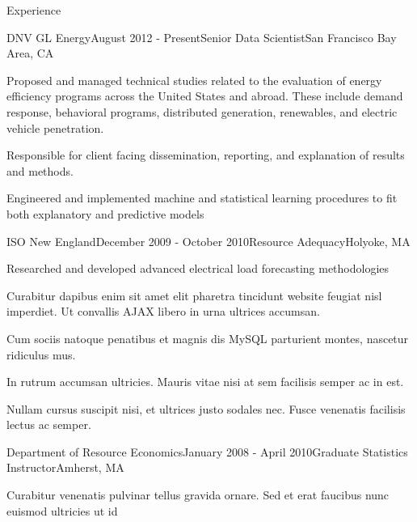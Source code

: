 \documentclass{resume} %
\begin{document}
\begin{rSection}{Experience}

\begin{rSubsection}{DNV GL Energy}{August 2012 - Present}{Senior Data Scientist}{San Francisco Bay Area, CA}
\item Proposed and managed technical studies related to the evaluation of energy efficiency programs across the United States and abroad. These include demand response, behavioral programs, distributed generation, renewables, and electric vehicle  penetration. 
\item Responsible for client facing dissemination, reporting, and explanation of results and methods. 
\item Engineered and implemented machine and statistical learning procedures to fit both explanatory and predictive models
\end{rSubsection}


\begin{rSubsection}{ISO New England}{December 2009 - October 2010}{Resource Adequacy}{Holyoke, MA}
\item Researched and developed advanced electrical load forecasting methodologies
\item Curabitur dapibus enim sit amet elit pharetra tincidunt website feugiat nisl imperdiet. Ut convallis AJAX libero in urna ultrices accumsan.
\item Cum sociis natoque penatibus et magnis dis MySQL parturient montes, nascetur ridiculus mus.
\item In rutrum accumsan ultricies. Mauris vitae nisi at sem facilisis semper ac in est.
\item Nullam cursus suscipit nisi, et ultrices justo sodales nec. Fusce venenatis facilisis lectus ac semper.
\end{rSubsection}


\begin{rSubsection}{Department of Resource Economics}{January 2008 - April 2010}{Graduate Statistics Instructor}{Amherst, MA}
\item 
\item Curabitur venenatis pulvinar tellus gravida ornare. Sed et erat faucibus nunc euismod ultricies ut id
\end{rSubsection}

\end{rSection}
\end{document}
